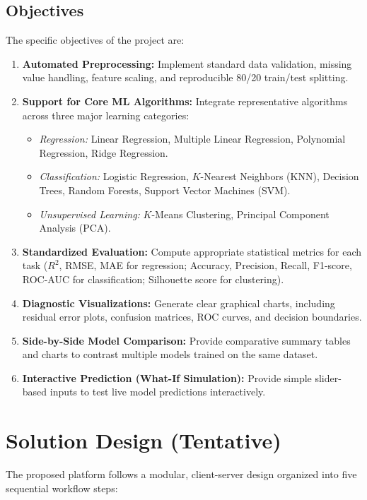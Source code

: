 \documentclass[11pt,a4paper]{article}
\begin{document}
\subsection{Objectives}
The specific objectives of the project are:
\begin{enumerate}[leftmargin=*,itemsep=1pt,topsep=2pt]
    \item \textbf{Automated Preprocessing:} Implement standard data validation, missing value handling, feature scaling, and reproducible 80/20 train/test splitting.
    \item \textbf{Support for Core ML Algorithms:} Integrate representative algorithms across three major learning categories:
    \begin{itemize}[leftmargin=*,itemsep=0pt,topsep=1pt]
        \item \textit{Regression:} Linear Regression, Multiple Linear Regression, Polynomial Regression, Ridge Regression.
        \item \textit{Classification:} Logistic Regression, $K$-Nearest Neighbors (KNN), Decision Trees, Random Forests, Support Vector Machines (SVM).
        \item \textit{Unsupervised Learning:} $K$-Means Clustering, Principal Component Analysis (PCA).
    \end{itemize}
    \item \textbf{Standardized Evaluation:} Compute appropriate statistical metrics for each task ($R^2$, RMSE, MAE for regression; Accuracy, Precision, Recall, F1-score, ROC-AUC for classification; Silhouette score for clustering).
    \item \textbf{Diagnostic Visualizations:} Generate clear graphical charts, including residual error plots, confusion matrices, ROC curves, and decision boundaries.
    \item \textbf{Side-by-Side Model Comparison:} Provide comparative summary tables and charts to contrast multiple models trained on the same dataset.
    \item \textbf{Interactive Prediction (What-If Simulation):} Provide simple slider-based inputs to test live model predictions interactively.
\end{enumerate}

\section{Solution Design (Tentative)}
\label{sec:solution_design}
The proposed platform follows a modular, client-server design organized into five sequential workflow steps:
\end{document}
